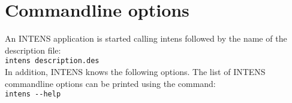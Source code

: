 \newpage
\section{Commandline options}
\label{sec:cloptions}
An INTENS application is started calling intens followed by the name of the
description file: \\
\verb+intens description.des+ \\
In addition, INTENS knows the following options.
The list of INTENS commandline options can be printed using the command: \\
\verb+intens --help+

